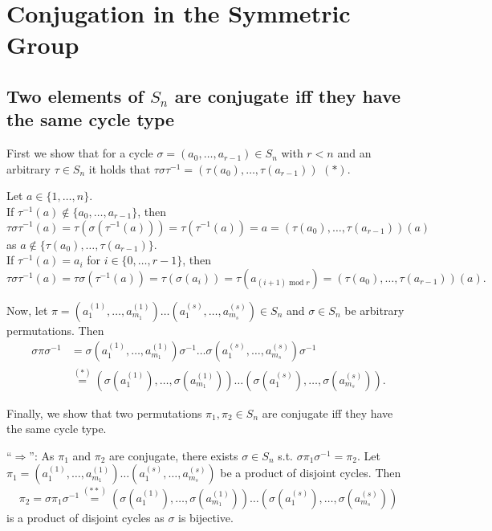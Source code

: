 \section{Conjugation in the Symmetric Group}

\subsection{Two elements of $S_n$ are conjugate iff they have the same cycle type}
First we show that for a cycle $\sigma = (a_0, \dots, a_{r-1}) \in S_n$ with $r < n$ and an arbitrary $\tau \in S_n$ it holds that $\tau \sigma \tau^{-1} = (\tau(a_0), \dots, \tau(a_{r-1}))$ $(\ast)$.

Let $a \in \{1, \dots, n\}$.\\
If $\tau^{-1}(a) \notin \{a_0, \dots, a_{r-1}\}$, then 
\[ \tau \sigma \tau^{-1}(a) = \tau(\sigma (\tau^{-1}(a))) = \tau(\tau^{-1}(a)) = a = (\tau(a_0), \dots, \tau(a_{r-1}))(a) \] 
as $a \notin \{\tau(a_0), \dots, \tau(a_{r-1})\}$.\\
If $\tau^{-1}(a) = a_i$ for $i \in \{0, \dots, r-1\}$, then
\[ \tau \sigma \tau^{-1}(a) = \tau \sigma(\tau^{-1}(a)) = \tau(\sigma(a_i)) = \tau(a_{(i+1) \operatorname{mod} r}) = (\tau(a_0), \dots, \tau(a_{r-1}))(a). \]

Now, let $\pi = (a_1^{(1)}, \dots, a_{m_1}^{(1)}) \dots (a_1^{(s)}, \dots, a_{m_s}^{(s)}) \in S_n$ and $\sigma \in S_n$ be arbitrary permutations. Then
\begin{equation} \tag{$\ast \ast$}
\begin{split}
\sigma \pi \sigma^{-1} & = \sigma (a_1^{(1)}, \dots, a_{m_1}^{(1)}) \sigma^{-1} \dots \sigma (a_1^{(s)}, \dots, a_{m_s}^{(s)}) \sigma^{-1} \\
& \stackrel{(\ast)}{=} (\sigma(a_1^{(1)}), \dots, \sigma(a_{m_1}^{(1)})) \dots (\sigma(a_1^{(s)}), \dots, \sigma(a_{m_s}^{(s)})).
\end{split}
\end{equation}

Finally, we show that two permutations $\pi_1, \pi_2 \in S_n$ are conjugate iff they have the same cycle type.

``$\Rightarrow$'': As $\pi_1$ and $\pi_2$ are conjugate, there exists $\sigma \in S_n$ s.t. $\sigma \pi_1 \sigma^{-1} = \pi_2$. Let $\pi_1 =  (a_1^{(1)}, \dots, a_{m_1}^{(1)}) \dots (a_1^{(s)}, \dots, a_{m_s}^{(s)})$ be a product of disjoint cycles. Then
\[ \pi_2 = \sigma \pi_1 \sigma^{-1} \stackrel{(\ast \ast)}{=} (\sigma(a_1^{(1)}), \dots, \sigma(a_{m_1}^{(1)})) \dots (\sigma(a_1^{(s)}), \dots, \sigma(a_{m_s}^{(s)})) \]
is a product of disjoint cycles as $\sigma$ is bijective.

